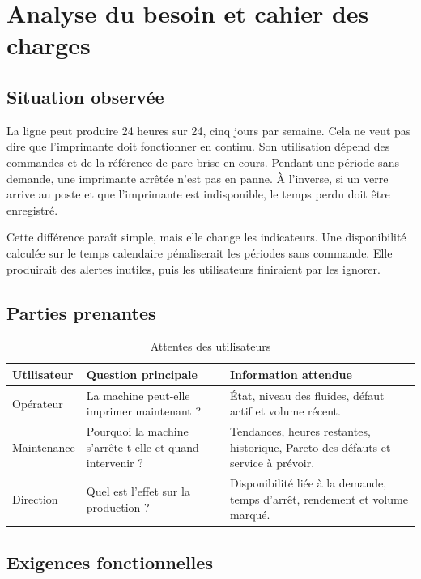 \chapter{Analyse du besoin et cahier des charges}

\section{Situation observée}

La ligne peut produire 24 heures sur 24, cinq jours par semaine. Cela ne veut
pas dire que l'imprimante doit fonctionner en continu. Son utilisation dépend
des commandes et de la référence de pare-brise en cours. Pendant une période
sans demande, une imprimante arrêtée n'est pas en panne. À l'inverse, si un
verre arrive au poste et que l'imprimante est indisponible, le temps perdu doit
être enregistré.

Cette différence paraît simple, mais elle change les indicateurs. Une
disponibilité calculée sur le temps calendaire pénaliserait les périodes sans
commande. Elle produirait des alertes inutiles, puis les utilisateurs
finiraient par les ignorer.

\section{Parties prenantes}

\begin{table}[H]
\centering
\caption{Attentes des utilisateurs}
\begin{tabularx}{\textwidth}{p{}YY}
\toprule
Utilisateur & Question principale & Information attendue \\
\midrule
Opérateur &
La machine peut-elle imprimer maintenant ? &
État, niveau des fluides, défaut actif et volume récent. \\
Maintenance &
Pourquoi la machine s'arrête-t-elle et quand intervenir ? &
Tendances, heures restantes, historique, Pareto des défauts et service à prévoir. \\
Direction &
Quel est l'effet sur la production ? &
Disponibilité liée à la demande, temps d'arrêt, rendement et volume marqué. \\
\bottomrule
\end{tabularx}
\end{table}

\section{Exigences fonctionnelles}

